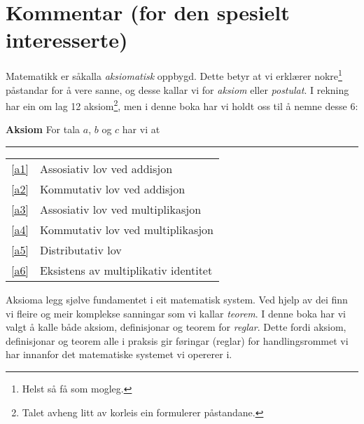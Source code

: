 



	
\section*{Kommentar (for den spesielt interesserte) \label{Kommentar1}}
Matematikk er såkalla \textit{aksiomatisk} oppbygd. Dette betyr at vi erklærer nokre\footnote{Helst så få som mogleg.} påstandar for å vere sanne, og desse kallar vi for \textit{aksiom} eller \textit{postulat}. I rekning har ein om lag 12 aksiom\footnote{Talet avheng litt av korleis ein formulerer påstandane.}, men i denne boka har vi holdt oss til å nemne desse 6:
\regv 

\begin{tcolorbox}[boxrule=0.3 mm,arc=0mm,colback=blue!5] {\large \textbf{Aksiom} \vspace{5 pt}}\newline
For tala $ a $, $ b $ og $ c $ har vi at
\rule{1\linewidth}{0.75bp}
\begin{center}
	\begin{tabular}{rl}
		\eqref{a1} &Assosiativ lov ved addisjon\\
		\eqref{a2} & Kommutativ lov ved addisjon \\	
		\eqref{a3} & Assosiativ lov ved multiplikasjon \\
		\eqref{a4} & Kommutativ lov ved multiplikasjon \\		
		\eqref{a5} & Distributativ lov\\	
		\eqref{a6} & Eksistens av multiplikativ identitet
	\end{tabular}
\end{center}
\end{tcolorbox}
\vsk
Aksioma legg sjølve fundamentet i eit matematisk system. Ved hjelp av dei finn vi fleire og meir komplekse sanningar som vi kallar \textit{teorem}. I denne boka har vi valgt å kalle både aksiom, definisjonar og teorem for \textsl{reglar}. Dette fordi aksiom, definisjonar og teorem alle i praksis gir føringar (reglar) for handlingsrommet vi har innanfor det matematiske systemet vi opererer i.\vsk
